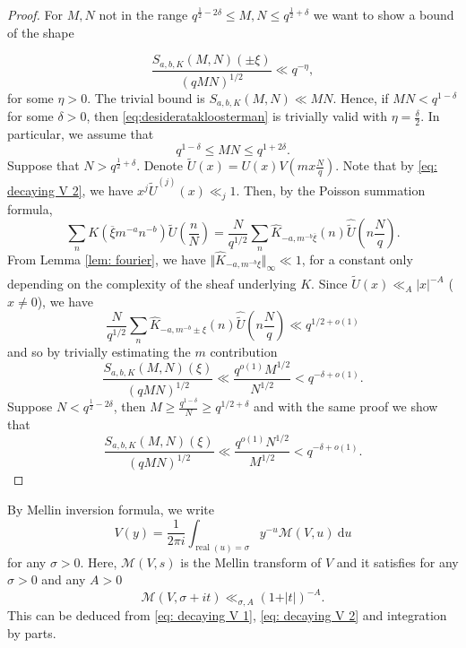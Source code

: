 \documentclass[12pt]{amsart}
\theoremstyle{plain}
\theoremstyle{definition}
\theoremstyle{remark}
\numberwithin{equation}{section}
\renewcommand{\geq}{\geqslant}
\renewcommand{\leq}{\leqslant}
\begin{document}
\begin{proof}




For $M,N$ not in the range $q^{\frac 12-2\delta}\leq M,N\leq q^{\frac 12+\delta}$ we want to show a bound of the shape 

\begin{equation*} 
\frac{S_{a,b,K}(M,N)(\pm \xi)}{(qMN)^{1/2}} \ll q^{-\eta}, \end{equation*}
    for some $\eta >0$. 
The trivial bound is $S_{a,b,K}(M,N)\ll MN$. Hence, if $MN< q^{1-\delta}$ for some $\delta >0$, then \eqref{eq:desideratakloosterman} is trivially valid with $\eta = \frac{\delta}{2}$. In particular, we assume that 
\begin{equation*}\label{eq:MNnonsmall}
q^{1-\delta} \leq MN \leq q^{1+2\delta}.
\end{equation*}
Suppose that $N>q^{\frac 12+\delta}$. Denote $\tilde{U}(x) = U(x)V(mx\frac{N}{q})$. Note that by \eqref{eq: decaying V 2}, we have $x^{j}\tilde{U}^{(j)}(x) \ll_j 1$. Then, by the Poisson summation formula, 
\[\sum_{n}K(\overline{\xi} m^{-a}n^{-b})\tilde{U}\left(\frac{n}{N}\right) = \frac{N}{q^{1/2}}\sum_{n}\hat{K}_{-a,m^{-b}\overline{\xi}}(n)\widehat{\tilde{U}}\left(n\frac{N}{q}\right). \]
From Lemma \ref{lem: fourier}, we have
$\Vert{\hat{K}_{-a,m^{-b}\xi}}\Vert_{\infty} \ll 1$, for a constant only depending on the complexity of the sheaf underlying $K$. Since $\widehat{\tilde{U}}(x) \ll_A \vert{x}\vert^{-A}$ ($x\neq 0$), we have   
\[\frac{N}{q^{1/2}}\sum_{n}\hat{K}_{-a,m^{-b}\pm\xi}(n)\widehat{\tilde{U}}\left(n\frac{N}{q}\right)\ll q^{1/2+o(1)}\]
and so by trivially estimating the $m$ contribution
\[\frac{S_{a,b,K}(M,N)(\xi)}{(qMN)^{1/2}}
\ll \frac{q^{o(1)}M^{1/2}}{N^{1/2}}  < q^{-\delta+o(1)}. \]
Suppose $N<q^{\frac 12- 2\delta}$, then $M \geq \frac{q^{1-\delta}}{N}\geq q^{1/2+\delta}$ and  
with the same proof we show that 
\[\frac{S_{a,b,K}(M,N)(\xi)}{(qMN)^{1/2}}
\ll \frac{q^{o(1)}N^{1/2}}{M^{1/2}}  < q^{-\delta+o(1)}.\]

\end{proof}


By Mellin inversion formula, we write $$V(y) = \frac{1}{2\pi i}\int_{\operatorname{real}(u)=\sigma}y^{-u}\mathcal{M}(V,u) \ \mathrm{d}u $$ for any $\sigma>0$. Here, $\mathcal{M}(V,s)$ is the Mellin transform of $V$ and it satisfies for any $\sigma >0$ and any $A>0$ \begin{equation}
    \mathcal{M}(V,\sigma+it) \ll_{\sigma,A} (1+\vert t\vert )^{-A}.  
\end{equation}
This can be deduced from \eqref{eq: decaying V 1}, \eqref{eq: decaying V 2} and integration by parts. 
\end{document}
